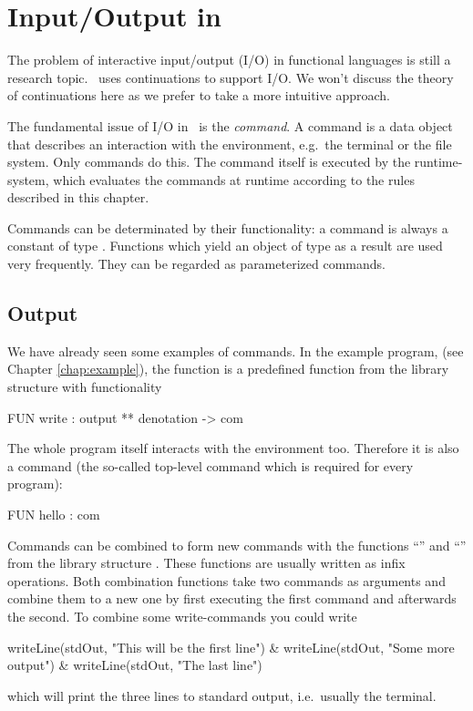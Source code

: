 \chapter{Input/Output in \opal}
\label{chap:IO}

\advanced
The problem of interactive input/output (I/O) in functional languages
is still a research topic.
\opal\ uses continuations to support I/O.
We won't discuss the theory of continuations here as we prefer to take a more
intuitive approach.


The fundamental issue of I/O in \opal\ is the {\em command\/}.
A command is a data object that describes an interaction with the environment,
e.g.~the terminal or the file system. Only commands do this.
The command itself is executed by the runtime-system, which
evaluates the commands at runtime according to the rules described in
this chapter.

Commands can be determinated by their functionality: a command is
always a constant of type .  Functions which yield an object
of type  as a result are used very frequently. They can
be regarded as parameterized commands.

\section{Output}
\label{sec:output}
\advanced
We have already seen some examples of commands.
In the example program,  (see Chapter \ref{chap:example}), the
function  is a predefined function from the library
structure  with functionality
\begin{prog}
        FUN write : output ** denotation -> com
\end{prog}

The whole program itself interacts with the environment too.
Therefore it is also a command (the so-called top-level command which
is required for every program):
\begin{prog}
        FUN hello : com
\end{prog}

\medskip

Commands can be combined to form new commands with the functions
``\pro{;}'' and ``\pro{\&}'' from the library structure .
These functions are usually written as infix operations.
Both combination functions take two commands as arguments and combine
them to a new one by first executing the first command and afterwards
the second.
To combine some write-commands you could write
\begin{prog}
        writeLine(stdOut, "This will be the first line") \&
        writeLine(stdOut, "Some more output") \&
        writeLine(stdOut, "The last line")
\end{prog}
which will print the three lines to standard output, i.e.~usually the terminal.

